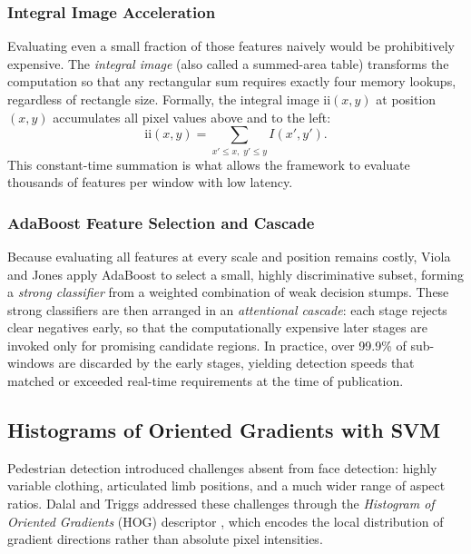 \documentclass[conference]{IEEEtran}
\begin{document}
\subsubsection*{Integral Image Acceleration}

Evaluating even a small fraction of those features naively would
be prohibitively expensive.
The \emph{integral image} (also called a summed-area table)
transforms the computation so that any rectangular sum requires
exactly four memory lookups, regardless of rectangle size.
Formally, the integral image $\text{ii}(x,y)$ at position $(x,y)$
accumulates all pixel values above and to the left:
\begin{equation}
  \text{ii}(x,y) = \sum_{x' \leq x,\; y' \leq y} I(x', y').
  \label{eq:ii}
\end{equation}
This constant-time summation is what allows the framework to
evaluate thousands of features per window with low latency.

\subsubsection*{AdaBoost Feature Selection and Cascade}

Because evaluating all features at every scale and position
remains costly, Viola and Jones apply AdaBoost
\cite{freund1997decision} to select a small, highly discriminative
subset, forming a \emph{strong classifier} from a weighted
combination of weak decision stumps.
These strong classifiers are then arranged in an \emph{attentional
cascade}: each stage rejects clear negatives early, so that the
computationally expensive later stages are invoked only for
promising candidate regions.
In practice, over 99.9\% of sub-windows are discarded by the
early stages, yielding detection speeds that matched or exceeded
real-time requirements at the time of publication.

\subsection{Histograms of Oriented Gradients with SVM}
\label{subsec:hog}

Pedestrian detection introduced challenges absent from face
detection: highly variable clothing, articulated limb positions,
and a much wider range of aspect ratios.
Dalal and Triggs addressed these challenges through the
\emph{Histogram of Oriented Gradients} (HOG) descriptor
\cite{dalal2005histograms}, which encodes the local distribution
of gradient directions rather than absolute pixel intensities.
\end{document}
